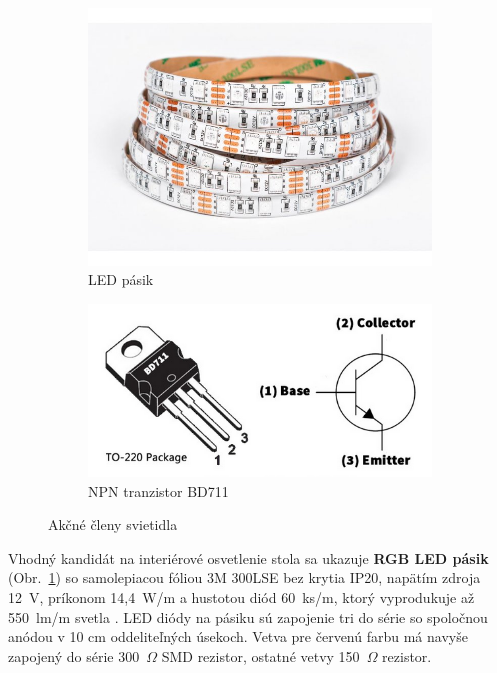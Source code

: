 \documentclass[12pt, a4paper]{article}
\begin{document}
\begin{figure}[h]
\centering
\begin{subfigure}[b]{0.45\textwidth}
	\centering
	\includegraphics[width=\textwidth]{assets/rgb-led.jpg}
	\caption{LED pásik}
	\label{fig:rgb-led}
\end{subfigure}
\hfill
\begin{subfigure}[b]{0.5\textwidth}
	\centering
	\includegraphics[width=\textwidth]{assets/bd711.png}
	\caption{NPN tranzistor BD711}
	\label{fig:bd-711}
\end{subfigure}
\caption{Akčné členy svietidla}
\end{figure}

Vhodný kandidát na interiérové osvetlenie stola sa ukazuje \textbf{RGB LED pásik} (Obr.~\ref{fig:rgb-led}) so samolepiacou fóliou 3M 300LSE bez krytia IP20, napätím zdroja 12~V, príkonom 14,4~W/m a hustotou diód 60~ks/m, ktorý vyprodukuje až 550~lm/m svetla \cite{123ledsk_rgb_nodate}. LED diódy na pásiku sú zapojenie tri do série so spoločnou anódou v 10 cm oddeliteľných úsekoch. Vetva pre červenú farbu má navyše zapojený do série 300~$\Omega$ SMD rezistor, ostatné vetvy 150~$\Omega$ rezistor.
\end{document}
